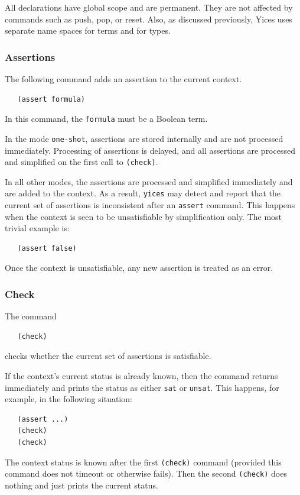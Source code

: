 \documentclass[11pt,twoside,fleqn,openright,titlepage]{cslreport}
\begin{document}
\medskip\noindent
All declarations have global scope and are permanent. They are not
affected by commands such as push, pop, or reset. Also, as discussed
previously, Yices uses separate name spaces for terms and for types.



\subsubsection*{Assertions}

The following command adds an assertion to the current context.
\begin{small}
\begin{verbatim}
   (assert formula)
\end{verbatim}
\end{small}
In this command, the \texttt{formula} must be a Boolean term.

\medskip\noindent
In the mode \texttt{one-shot}, assertions are stored internally and
are not processed immediately. Processing of assertions is delayed,
and all assertions are processed and simplified on the first call to
\texttt{(check)}.

\medskip\noindent
In all other modes, the assertions are processed and simplified
immediately and are added to the context. As a result, \texttt{yices}
may detect and report that the current set of assertions is
inconsistent after an \texttt{assert} command. This happens when the
context is seen to be unsatisfiable by simplification only. The most
trivial example is:
\begin{small}
\begin{verbatim}
   (assert false)
\end{verbatim}
\end{small}
Once the context is unsatisfiable, any new assertion is treated as an
error.


\subsubsection*{Check}

The command
\begin{small}
\begin{verbatim}
   (check)
\end{verbatim}
\end{small}
checks whether the current set of assertions is satisfiable.

\medskip\noindent
If the context's current status is already known, then the command
returns immediately and prints the status as either \texttt{sat} or
\texttt{unsat}. This happens, for example, in the following situation:
\begin{small}
\begin{verbatim}
   (assert ...)
   (check)
   (check)
\end{verbatim}
\end{small}
The context status is known after the first \texttt{(check)} command
(provided this command does not timeout or otherwise fails). Then the
second \texttt{(check)} does nothing and just prints the current
status.
\end{document}
